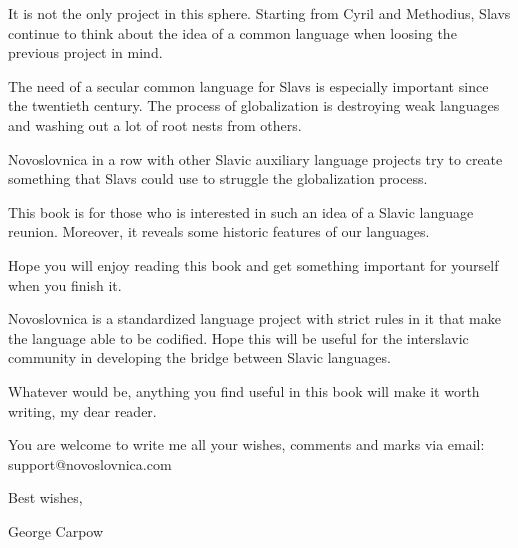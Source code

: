 It is not the only project in this sphere. Starting from Cyril and Methodius, Slavs continue to think about the idea of a common language when loosing the previous project in mind.

The need of a secular common language for Slavs is especially important since the twentieth century. The process of globalization is destroying weak languages and washing out a lot of root nests from others.

Novoslovnica in a row with other Slavic auxiliary language projects try to create something that Slavs could use to struggle the globalization process.

This book is for those who is interested in such an idea of a Slavic language reunion. Moreover, it reveals some historic features of our languages.

Hope you will enjoy reading this book and get something important for yourself when you finish it.

Novoslovnica is a standardized language project with strict rules in it that make the language able to be codified. Hope this will be useful for the interslavic community in developing the bridge between Slavic languages.

Whatever would be, anything you find useful in this book will make it worth writing, my dear reader.

You are welcome to write me all your wishes, comments and marks via email: support@novoslovnica.com

Best wishes,

George Carpow